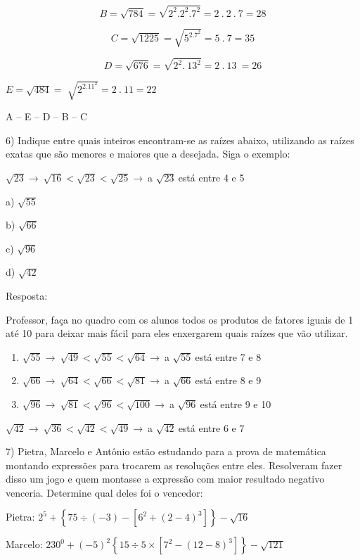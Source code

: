 \[B = \sqrt{784} = \sqrt{2^{2}.2^{2}.7^2} = 2\ .\ 2\ .\ 7 = 28\]

\[C = \sqrt{1225} = \sqrt{5^2.7^2} = 5\ .\ 7 = 35\]

\[D = \sqrt{676} = \sqrt{2^{2}.\ 13^2} = 2\ .\ 13\  = 26\]

\(E = \sqrt{484} =\) \(\sqrt{2^2.11^2} = 2\ .\ 11 = 22\)

A -- E -- D -- B -- C

6) Indique entre quais inteiros encontram-se as raízes abaixo,
utilizando as raízes exatas que são menores e maiores que a desejada.
Siga o exemplo:

\(\sqrt{23} \rightarrow \ \sqrt{16} < \sqrt{23} < \sqrt{25} \rightarrow \ \)a
\(\sqrt{23}\ \)está entre 4 e 5

a) \(\sqrt{55}\)

b) \(\sqrt{66}\)

c) \(\sqrt{96}\)

d) \(\sqrt{42}\)

Resposta:

Professor, faça no quadro com os alunos todos os produtos de fatores
iguais de 1 até 10 para deixar mais fácil para eles enxergarem quais
raízes que vão utilizar.

\begin{enumerate}
\def\labelenumi{\alph{enumi})}
\item
  \(\sqrt{55} \rightarrow \ \sqrt{49} < \sqrt{55} < \sqrt{64} \rightarrow \ \)a
  \(\sqrt{55}\ \)está entre 7 e 8
\item
  \(\sqrt{66} \rightarrow \ \sqrt{64} < \sqrt{66} < \sqrt{81} \rightarrow \ \)a
  \(\sqrt{66}\ \)está entre 8 e 9
\item
  \(\sqrt{96} \rightarrow \ \sqrt{81} < \sqrt{96} < \sqrt{100} \rightarrow \ \)a
  \(\sqrt{96}\ \)está entre 9 e 10
\end{enumerate}

\(\sqrt{42} \rightarrow \ \sqrt{36} < \sqrt{42} < \sqrt{49} \rightarrow \ \)a
\(\sqrt{42}\ \)está entre 6 e 7

7) Pietra, Marcelo e Antônio estão estudando para a prova de matemática
montando expressões para trocarem as resoluções entre eles. Resolveram
fazer disso um jogo e quem montasse a expressão com maior resultado
negativo venceria. Determine qual deles foi o vencedor:

Pietra:
\(2^{5} + \left\{ 75 \div \left( - 3 \right) - \left\lbrack 6^{2} + \left( 2 - 4 \right)^{3} \right\rbrack \right\} - \sqrt{16}\)

Marcelo:
\(230^{0} + ( - 5)^2\left\{ 15 \div 5 \times \left\lbrack 7^{2} - \left( 12 - 8 \right)^{3} \right\rbrack \right\} - \sqrt{121}\)


